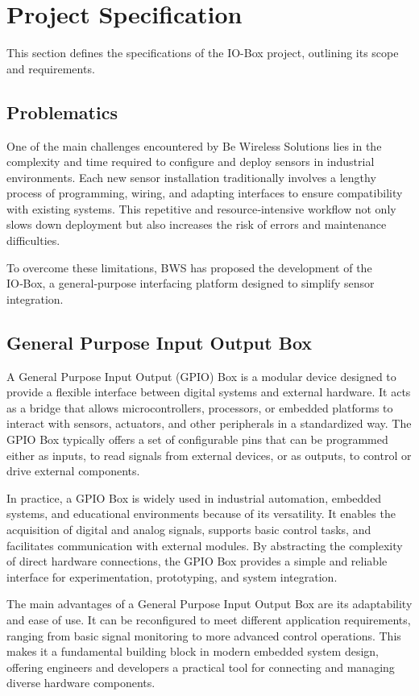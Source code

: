 \section{Project Specification}
This section defines the specifications of the IO-Box project, outlining its scope and
requirements.

\subsection{Problematics}

One of the main challenges encountered by Be Wireless Solutions lies in the complexity and
time required to configure and deploy sensors in industrial environments. Each new sensor
installation traditionally involves a lengthy process of programming, wiring, and adapting
interfaces to ensure compatibility with existing systems. This repetitive and resource‑intensive
workflow not only slows down deployment but also increases the risk of errors and
maintenance difficulties.

To overcome these limitations, BWS has proposed the development of the IO‑Box, a
general‑purpose interfacing platform designed to simplify sensor integration.

\subsection{General Purpose Input Output Box}

A General Purpose Input Output (GPIO) Box is a modular device designed to provide a
flexible interface between digital systems and external hardware. It acts as a bridge that
allows microcontrollers, processors, or embedded platforms to interact with sensors,
actuators, and other peripherals in a standardized way. The GPIO Box typically offers a
set of configurable pins that can be programmed either as inputs, to read signals from
external devices, or as outputs, to control or drive external components.

In practice, a GPIO Box is widely used in industrial automation, embedded systems, and
educational environments because of its versatility. It enables the acquisition of digital
and analog signals, supports basic control tasks, and facilitates communication with
external modules. By abstracting the complexity of direct hardware connections, the GPIO
Box provides a simple and reliable interface for experimentation, prototyping, and system
integration.

The main advantages of a General Purpose Input Output Box are its adaptability and ease
of use. It can be reconfigured to meet different application requirements, ranging from
basic signal monitoring to more advanced control operations. This makes it a fundamental
building block in modern embedded system design, offering engineers and developers a
practical tool for connecting and managing diverse hardware components.

